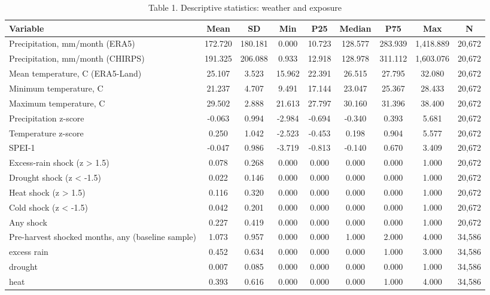 \begin{table}[htbp]\centering\small
\caption{Table 1. Descriptive statistics: weather and exposure}\label{tab:table1b_descriptives_weather}
\begin{tabular}{lcccccccc}
\toprule
Variable & Mean & SD & Min & P25 & Median & P75 & Max & N \\
\midrule
Precipitation, mm/month (ERA5) & 172.720 & 180.181 & 0.000 & 10.723 & 128.577 & 283.939 & 1,418.889 & 20,672 \\
Precipitation, mm/month (CHIRPS) & 191.325 & 206.088 & 0.933 & 12.918 & 128.978 & 311.112 & 1,603.076 & 20,672 \\
Mean temperature, C (ERA5-Land) & 25.107 & 3.523 & 15.962 & 22.391 & 26.515 & 27.795 & 32.080 & 20,672 \\
Minimum temperature, C & 21.237 & 4.707 & 9.491 & 17.144 & 23.047 & 25.367 & 28.433 & 20,672 \\
Maximum temperature, C & 29.502 & 2.888 & 21.613 & 27.797 & 30.160 & 31.396 & 38.400 & 20,672 \\
Precipitation z-score & -0.063 & 0.994 & -2.984 & -0.694 & -0.340 & 0.393 & 5.681 & 20,672 \\
Temperature z-score & 0.250 & 1.042 & -2.523 & -0.453 & 0.198 & 0.904 & 5.577 & 20,672 \\
SPEI-1 & -0.047 & 0.986 & -3.719 & -0.813 & -0.140 & 0.670 & 3.409 & 20,672 \\
Excess-rain shock (z > 1.5) & 0.078 & 0.268 & 0.000 & 0.000 & 0.000 & 0.000 & 1.000 & 20,672 \\
Drought shock (z < -1.5) & 0.022 & 0.146 & 0.000 & 0.000 & 0.000 & 0.000 & 1.000 & 20,672 \\
Heat shock (z > 1.5) & 0.116 & 0.320 & 0.000 & 0.000 & 0.000 & 0.000 & 1.000 & 20,672 \\
Cold shock (z < -1.5) & 0.042 & 0.201 & 0.000 & 0.000 & 0.000 & 0.000 & 1.000 & 20,672 \\
Any shock & 0.227 & 0.419 & 0.000 & 0.000 & 0.000 & 0.000 & 1.000 & 20,672 \\
Pre-harvest shocked months, any (baseline sample) & 1.073 & 0.957 & 0.000 & 0.000 & 1.000 & 2.000 & 4.000 & 34,586 \\
  excess rain & 0.452 & 0.634 & 0.000 & 0.000 & 0.000 & 1.000 & 3.000 & 34,586 \\
  drought & 0.007 & 0.085 & 0.000 & 0.000 & 0.000 & 0.000 & 1.000 & 34,586 \\
  heat & 0.393 & 0.616 & 0.000 & 0.000 & 0.000 & 1.000 & 4.000 & 34,586 \\

\end{tabular}
\end{table}
